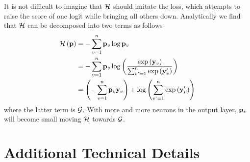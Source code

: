 \documentclass{article}
\begin{document}
It is not difficult to imagine that $\mathcal{H}$ should imitate the loss, which attempts to raise the score of one logit while bringing all others down. Analytically we find that $\mathcal{H}$ can be decomposed into two terms as follows
\begin{align}
    \mathcal{H}\left( \mathbf{p} \right) &= -\sum_{v=1}^n \mathbf{p}_v \log \mathbf{p}_v \\
    &= -\sum_{v=1}^n \mathbf{p}_v \log \left( \frac{\exp\left( \mathbf{y}_v \right)}{\sum_{v'=1}^n \exp\left( \mathbf{y}_v' \right) } \right) \\
    &= \left( -\sum_{v=1}^n \mathbf{p}_v \mathbf{y}_v \right) + \log \left( \sum_{v'=1}^n \exp\left( \mathbf{y}_v' \right)  \right)
\end{align}
where the latter term is $\mathcal{G}$. With more and more neurons in the output layer, $\mathbf{p}_v$ will become small moving $\mathcal{H}$ towards $\mathcal{G}$.
\section{Additional Technical Details}
\end{document}
